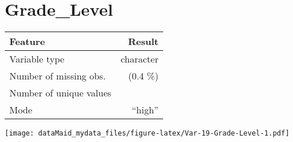 \documentclass[]{report}
\begin{document}
\noindent\makebox[\linewidth]{\rule{\textwidth}{0.4pt}}

\hypertarget{grade_level}{%
\section{Grade\_Level}\label{grade_level}}

\begin{minipage}{0.75 \textwidth}

\begin{longtable}[]{@{}lr@{}}
\toprule
\begin{minipage}[b]{0.34\columnwidth}\raggedright
Feature\strut
\end{minipage} & \begin{minipage}[b]{0.16\columnwidth}\raggedleft
Result\strut
\end{minipage}\tabularnewline
\midrule
\endhead
\begin{minipage}[t]{0.34\columnwidth}\raggedright
Variable type\strut
\end{minipage} & \begin{minipage}[t]{0.16\columnwidth}\raggedleft
character\strut
\end{minipage}\tabularnewline
\begin{minipage}[t]{0.34\columnwidth}\raggedright
Number of missing obs.\strut
\end{minipage} & \begin{minipage}[t]{0.16\columnwidth}\raggedleft
1 (0.4 \%)\strut
\end{minipage}\tabularnewline
\begin{minipage}[t]{0.34\columnwidth}\raggedright
Number of unique values\strut
\end{minipage} & \begin{minipage}[t]{0.16\columnwidth}\raggedleft
3\strut
\end{minipage}\tabularnewline
\begin{minipage}[t]{0.34\columnwidth}\raggedright
Mode\strut
\end{minipage} & \begin{minipage}[t]{0.16\columnwidth}\raggedleft
``high''\strut
\end{minipage}\tabularnewline
\bottomrule
\end{longtable}

\end{minipage}
\begin{minipage}{0.25 \textwidth}

\texttt{[image: dataMaid\_mydata\_files/figure-latex/Var-19-Grade-Level-1.pdf]}

\end{minipage}
\end{document}
